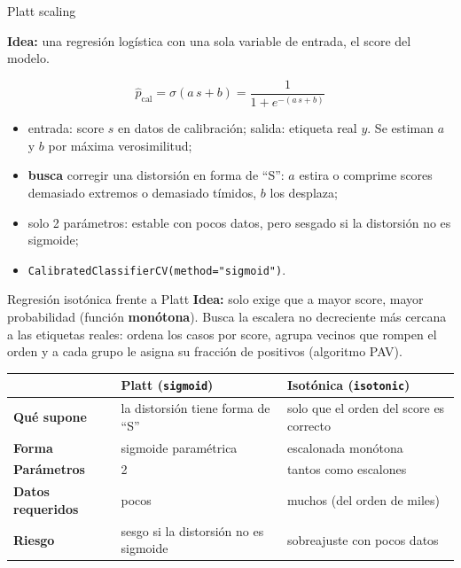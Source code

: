 \documentclass[aspectratio=169,12pt]{beamer}
\newcommand{\hrow}{\rowcolor{mlcream}}
\begin{document}
\begin{frame}{Platt scaling}
  \begin{center}
    \textbf{Idea:} una regresión logística con una sola variable de entrada, el score del modelo.
  \end{center}
  \Large\[ \hat{p}_{\text{cal}} = \sigma(a\,s + b) = \frac{1}{1 + e^{-(a\,s + b)}} \]
  \small
  \begin{itemize}
    \item entrada: score $s$ en datos de calibración; salida: etiqueta real $y$. Se estiman $a$ y $b$ por máxima verosimilitud;
    \item \textbf{busca} corregir una distorsión en forma de ``S'': $a$ estira o comprime scores demasiado extremos o demasiado tímidos, $b$ los desplaza;
    \item solo 2 parámetros: estable con pocos datos, pero sesgado si la distorsión no es sigmoide;
    \item \texttt{CalibratedClassifierCV(method="sigmoid")}.
  \end{itemize}
\end{frame}

\begin{frame}{Regresión isotónica frente a Platt}
  \small
  \textbf{Idea:} solo exige que a mayor score, mayor probabilidad (función \textbf{monótona}). Busca la escalera no decreciente más cercana a las etiquetas reales: ordena los casos por score, agrupa vecinos que rompen el orden y a cada grupo le asigna su fracción de positivos (algoritmo PAV).
  \par\vspace{6pt}
  \centering\footnotesize
  \begin{tabular}{@{}l L{0.36\textwidth} L{0.36\textwidth}@{}}
    \toprule
    \hrow & Platt (\texttt{sigmoid}) & Isotónica (\texttt{isotonic}) \\
    \midrule
    \textbf{Qué supone} & la distorsión tiene forma de ``S'' & solo que el orden del score es correcto \\
    \textbf{Forma} & sigmoide paramétrica & escalonada monótona \\
    \textbf{Parámetros} & 2 & tantos como escalones \\
    \textbf{Datos requeridos} & pocos & muchos (del orden de miles) \\
    \textbf{Riesgo} & sesgo si la distorsión no es sigmoide & sobreajuste con pocos datos \\
    \bottomrule
  \end{tabular}
\end{frame}
\end{document}
